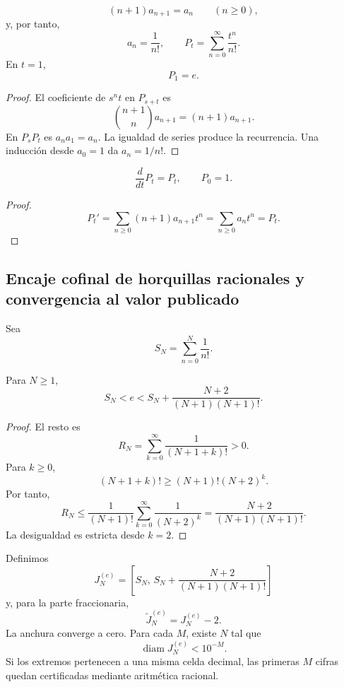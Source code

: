 \begin{theorem}
\label{p12-83-c9-s2:thm:recurrencia-factorial-e}
\[
 (n+1)a_{n+1}=a_n
 \qquad(n\geq0),
\]
y, por tanto,
\[
 a_n=\frac1{n!},
 \qquad
 P_t=\sum_{n=0}^{\infty}\frac{t^n}{n!}.
\]
En \(t=1\),
\[
 \boxed{P_1=e.}
\]
\end{theorem}

\begin{proof}
El coeficiente de \(s^nt\) en \(P_{s+t}\) es
\[
 \binom{n+1}{n}a_{n+1}=(n+1)a_{n+1}.
\]
En \(P_sP_t\) es \(a_na_1=a_n\). La igualdad de series produce la
recurrencia. Una inducción desde \(a_0=1\) da \(a_n=1/n!\).
\end{proof}

\begin{corollary}
\[
 \frac{d}{dt}P_t=P_t,
 \qquad P_0=1.
\]
\end{corollary}

\begin{proof}
\[
 P_t'=\sum_{n\geq0}(n+1)a_{n+1}t^n
 =\sum_{n\geq0}a_nt^n=P_t.
\]
\end{proof}

\subsection{Encaje cofinal de horquillas racionales y convergencia al valor publicado}

Sea
\[
 S_N=\sum_{n=0}^{N}\frac1{n!}.
\]

\begin{theorem}
\label{p12-83-c9-s2:thm:cota-factorial-e}
Para \(N\geq1\),
\begin{equation}
 \boxed{
 S_N<e<
 S_N+\frac{N+2}{(N+1)(N+1)!}.}
 \label{p12-83-c9-s2:eq:horquilla-factorial-e}
\end{equation}
\end{theorem}

\begin{proof}
El resto es
\[
 R_N=\sum_{k=0}^{\infty}\frac1{(N+1+k)!}>0.
\]
Para \(k\geq0\),
\[
 (N+1+k)!
 \geq(N+1)!(N+2)^k.
\]
Por tanto,
\[
 R_N
 \leq\frac1{(N+1)!}
 \sum_{k=0}^{\infty}\frac1{(N+2)^k}
 =\frac{N+2}{(N+1)(N+1)!}.
\]
La desigualdad es estricta desde \(k=2\).
\end{proof}

Definimos
\[
 J_N^{(e)}=
 \left[
 S_N,\,
 S_N+\frac{N+2}{(N+1)(N+1)!}
 \right]
\]
y, para la parte fraccionaria,
\[
 \widetilde J_N^{(e)}=J_N^{(e)}-2.
\]
La anchura converge a cero. Para cada \(M\), existe \(N\) tal que
\[
 \operatorname{diam}J_N^{(e)}<10^{-M}.
\]
Si los extremos pertenecen a una misma celda decimal, las primeras \(M\)
cifras quedan certificadas mediante aritmética racional.


